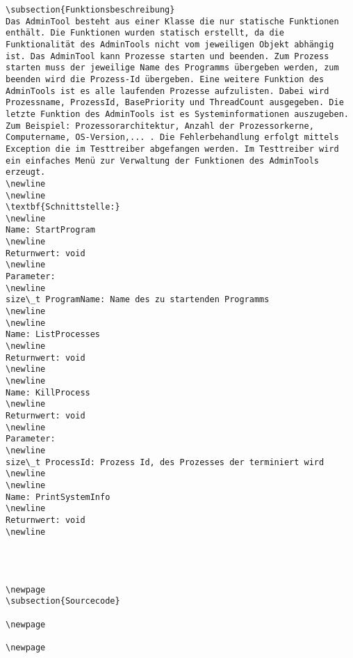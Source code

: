 \documentclass[12pt,a4paper]{article}
\begin{document}
{\begin {verbatim}
\subsection{Funktionsbeschreibung}
Das AdminTool besteht aus einer Klasse die nur statische Funktionen enthält. Die Funktionen wurden statisch erstellt, da die Funktionalität des AdminTools nicht vom jeweiligen Objekt abhängig ist. Das AdminTool kann Prozesse starten und beenden. Zum Prozess starten muss der jeweilige Name des Programms übergeben werden, zum beenden wird die Prozess-Id übergeben. Eine weitere Funktion des AdminTools ist es alle laufenden Prozesse aufzulisten. Dabei wird Prozessname, ProzessId, BasePriority und ThreadCount ausgegeben. Die letzte Funktion des AdminTools ist es Systeminformationen auszugeben. Zum Beispiel: Prozessorarchitektur, Anzahl der Prozessorkerne, Computername, OS-Version,... . Die Fehlerbehandlung erfolgt mittels Exception die im Testtreiber abgefangen werden. Im Testtreiber wird ein einfaches Menü zur Verwaltung der Funktionen des AdminTools erzeugt.
\newline
\newline
\textbf{Schnittstelle:}
\newline
Name: StartProgram
\newline
Returnwert: void
\newline
Parameter: 
\newline
size\_t ProgramName: Name des zu startenden Programms
\newline
\newline
Name: ListProcesses
\newline
Returnwert: void
\newline
\newline
Name: KillProcess
\newline
Returnwert: void
\newline
Parameter: 
\newline
size\_t ProcessId: Prozess Id, des Prozesses der terminiert wird
\newline
\newline
Name: PrintSystemInfo
\newline
Returnwert: void
\newline




\newpage
\subsection{Sourcecode}

\newpage

\newpage



\end{verbatim}}
\end{document}
